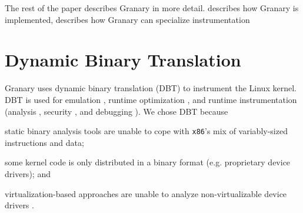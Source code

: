 \documentclass[preprint]{sigplanconf}
\begin{document}
The rest of the paper describes Granary in more detail.  describes how Granary is implemented,  describes how Granary can specialize instrumentation 


\section{Dynamic Binary Translation}\label{sec:dbt}

Granary uses dynamic binary translation (DBT) to instrument the Linux kernel. DBT is used for emulation \cite{QEMU}, runtime optimization \cite{DynamoRIOOptimization}, and runtime instrumentation (analysis \cite{DynamoRIO, DRK, btkernel, ProfilingSimics}, security \cite{Vx32,NaCl,ProgramShepherding}, and debugging \cite{Valgrind}). We chose DBT because \begin{inparaenum}[i)]
	\item static binary analysis tools are unable to cope with \texttt{x86}'s mix of variably-sized instructions and data; 
	\item some kernel code is only distributed in a binary format (e.g. proprietary device drivers); and
	\item virtualization-based approaches are unable to analyze non-virtualizable device drivers \cite{DRK}.
\end{inparaenum}
\end{document}
